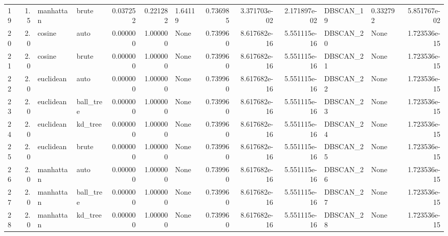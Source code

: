 \begin{tabular}{lrllrrlrrrllr}
19 &  1.5 &  manhattan &      brute &             0.037252 &            0.221282 &              1.64119 &               0.736985 &       3.371703e-02 &       2.171897e-02 &  DBSCAN\_19 &         0.332792 &     5.851767e-02 \\
20 &  2.0 &     cosine &       auto &             0.000000 &            1.000000 &                 None &               0.739960 &       8.617682e-16 &       5.551115e-16 &  DBSCAN\_20 &             None &     1.723536e-15 \\
21 &  2.0 &     cosine &      brute &             0.000000 &            1.000000 &                 None &               0.739960 &       8.617682e-16 &       5.551115e-16 &  DBSCAN\_21 &             None &     1.723536e-15 \\
22 &  2.0 &  euclidean &       auto &             0.000000 &            1.000000 &                 None &               0.739960 &       8.617682e-16 &       5.551115e-16 &  DBSCAN\_22 &             None &     1.723536e-15 \\
23 &  2.0 &  euclidean &  ball\_tree &             0.000000 &            1.000000 &                 None &               0.739960 &       8.617682e-16 &       5.551115e-16 &  DBSCAN\_23 &             None &     1.723536e-15 \\
24 &  2.0 &  euclidean &    kd\_tree &             0.000000 &            1.000000 &                 None &               0.739960 &       8.617682e-16 &       5.551115e-16 &  DBSCAN\_24 &             None &     1.723536e-15 \\
25 &  2.0 &  euclidean &      brute &             0.000000 &            1.000000 &                 None &               0.739960 &       8.617682e-16 &       5.551115e-16 &  DBSCAN\_25 &             None &     1.723536e-15 \\
26 &  2.0 &  manhattan &       auto &             0.000000 &            1.000000 &                 None &               0.739960 &       8.617682e-16 &       5.551115e-16 &  DBSCAN\_26 &             None &     1.723536e-15 \\
27 &  2.0 &  manhattan &  ball\_tree &             0.000000 &            1.000000 &                 None &               0.739960 &       8.617682e-16 &       5.551115e-16 &  DBSCAN\_27 &             None &     1.723536e-15 \\
28 &  2.0 &  manhattan &    kd\_tree &             0.000000 &            1.000000 &                 None &               0.739960 &       8.617682e-16 &       5.551115e-16 &  DBSCAN\_28 &             None &     1.723536e-15 \\

\end{tabular}
